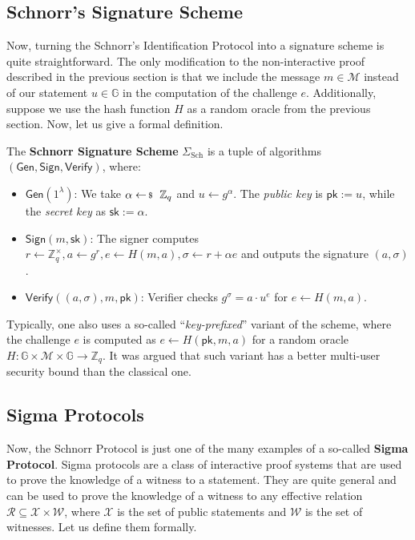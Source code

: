 \documentclass[../lecture-notes-148x210.tex]{subfiles}
\begin{document}
\subsection{Schnorr's Signature Scheme}

Now, turning the Schnorr's Identification Protocol into a signature scheme is quite straightforward. The only modification to the non-interactive proof described in the previous section is that we include the message $m \in \mathcal{M}$ instead of our statement $u \in \mathbb{G}$ in the computation of the challenge $e$. Additionally, suppose we use the hash function $H$ as a random oracle from the previous section. Now, let us give a formal definition.

\begin{definition}
    The \textbf{Schnorr Signature Scheme} $\Sigma_{\text{Sch}}$ \cite{schnorr1989} is a tuple of algorithms $(\mathsf{Gen}, \mathsf{Sign}, \mathsf{Verify})$, where:
    \begin{itemize}
        \item $\mathsf{Gen}(1^{\lambda})$: We take $\alpha \leftarrowS \mathbb{Z}_q$ and $u \gets g^{\alpha}$. The \textit{public key} is $\mathsf{pk} := u$, while the \textit{secret key} as $\mathsf{sk} := \alpha$.
        \item $\mathsf{Sign}(m,\mathsf{sk})$: The signer computes $r \gets \mathbb{Z}_q^{\times}, a \gets g^{r}, e \gets H(m, a), \sigma \gets r + \alpha e$ and outputs the signature $(a,\sigma)$.
        \item $\mathsf{Verify}((a, \sigma), m,\mathsf{pk})$: Verifier checks $g^{\sigma} = a \cdot u^e$ for $e \gets H(m, a)$.
    \end{itemize}
\end{definition}

\begin{remark}
    Typically, one also uses a so-called ``\textit{key-prefixed}'' variant of the scheme, where the challenge $e$ is computed as $e \gets H(\mathsf{pk}, m, a)$ for a random oracle $H: \mathbb{G} \times \mathcal{M} \times \mathbb{G} \to \mathbb{Z}_q$. It was argued that such variant has a better multi-user security bound than the classical one.
\end{remark}

\subsection{Sigma Protocols}

Now, the Schnorr Protocol is just one of the many examples of a so-called \textbf{Sigma Protocol}. Sigma protocols are a class of interactive proof systems that are used to prove the knowledge of a witness to a statement. They are quite general and can be used to prove the knowledge of a witness to any effective relation $\mathcal{R} \subseteq \mathcal{X} \times \mathcal{W}$, where $\mathcal{X}$ is the set of public statements and $\mathcal{W}$ is the set of witnesses. Let us define them formally.
\end{document}
